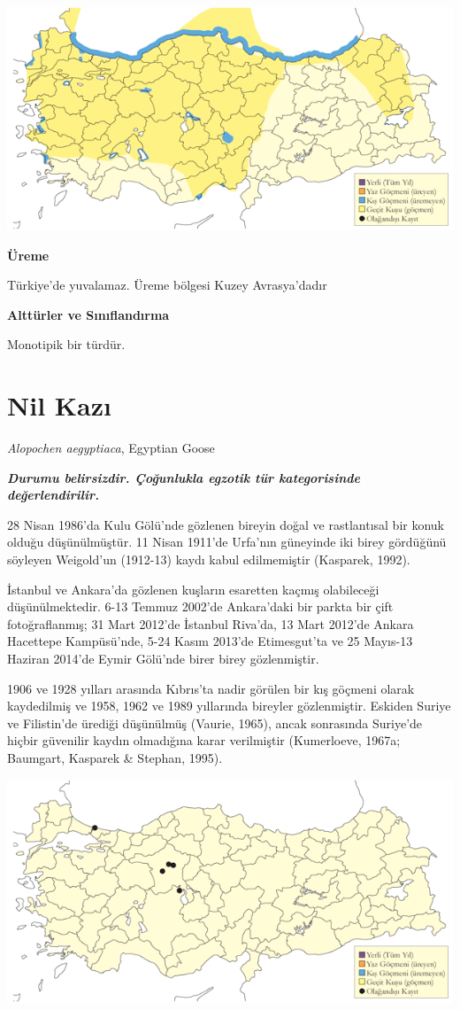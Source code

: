 \documentclass[
  a4paper,
  DIV=11,
  numbers=noendperiod]{scrreprt}
\begin{document}
\includegraphics{images/harita_Page_010.png}

\textbf{Üreme}

Türkiye'de yuvalamaz. Üreme bölgesi Kuzey Avrasya'dadır

\textbf{Alttürler ve Sınıflandırma}

Monotipik bir türdür.

\section{Nil Kazı}\label{nil-kazux131}

\emph{Alopochen aegyptiaca}, Egyptian Goose

\textbf{\emph{Durumu belirsizdir. Çoğunlukla egzotik tür kategorisinde
değerlendirilir.}}

28 Nisan 1986'da Kulu Gölü'nde gözlenen bireyin doğal ve rastlantısal
bir konuk olduğu düşünülmüştür. 11 Nisan 1911'de Urfa'nın güneyinde iki
birey gördüğünü söyleyen Weigold'un (1912-13) kaydı kabul edilmemiştir
(Kasparek, 1992).

İstanbul ve Ankara'da gözlenen kuşların esaretten kaçmış olabileceği
düşünülmektedir. 6-13 Temmuz 2002'de Ankara'daki bir parkta bir çift
fotoğraflanmış; 31 Mart 2012'de İstanbul Riva'da, 13 Mart 2012'de Ankara
Hacettepe Kampüsü'nde, 5-24 Kasım 2013'de Etimesgut'ta ve 25 Mayıs-13
Haziran 2014'de Eymir Gölü'nde birer birey gözlenmiştir.

1906 ve 1928 yılları arasında Kıbrıs'ta nadir görülen bir kış göçmeni
olarak kaydedilmiş ve 1958, 1962 ve 1989 yıllarında bireyler
gözlenmiştir. Eskiden Suriye ve Filistin'de ürediği düşünülmüş (Vaurie,
1965), ancak sonrasında Suriye'de hiçbir güvenilir kaydın olmadığına
karar verilmiştir (Kumerloeve, 1967a; Baumgart, Kasparek \& Stephan,
1995).

\includegraphics{images/harita_Page_011.png}
\end{document}
